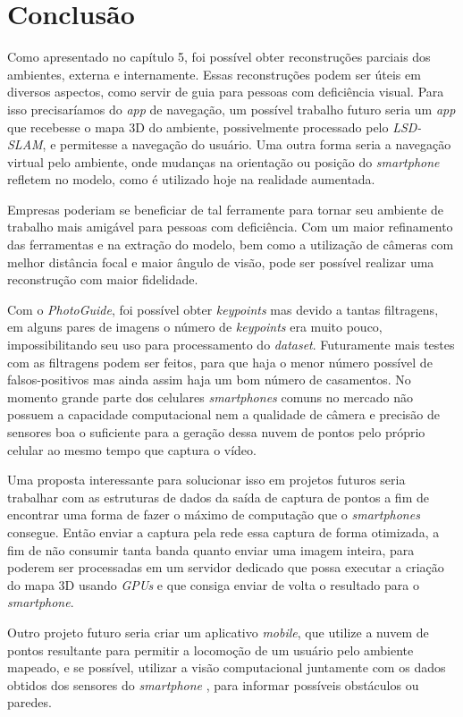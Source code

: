 \chapter{Conclusão}
Como apresentado no capítulo 5, foi possível obter reconstruções parciais dos ambientes, externa e internamente. Essas reconstruções podem ser úteis em diversos aspectos, como servir de guia para pessoas com deficiência visual. Para isso precisaríamos do \textit{app} de navegação, um possível trabalho futuro seria um \textit{app} que recebesse o mapa 3D do ambiente, possivelmente processado pelo \textit{LSD-SLAM}, e permitesse a navegação do usuário. Uma outra forma seria a navegação virtual pelo ambiente, onde mudanças na orientação ou posição do \textit{smartphone} refletem no modelo, como é utilizado hoje na realidade aumentada.

Empresas poderiam se beneficiar de tal ferramente para tornar seu ambiente de trabalho mais amigável para pessoas com deficiência. Com um maior refinamento das ferramentas e na extração do modelo, bem como a utilização de câmeras com melhor distância focal e maior ângulo de visão, pode ser possível realizar uma reconstrução com maior fidelidade. 

 Com o \textit{PhotoGuide}, foi possível obter \textit{keypoints} mas devido a tantas filtragens, em alguns pares de imagens o número de \textit{keypoints} era muito pouco, impossibilitando seu uso para processamento do \textit{dataset}. Futuramente mais testes com as filtragens podem ser feitos, para que haja o menor número possível de falsos-positivos mas ainda assim haja um bom número de casamentos. No momento grande parte dos celulares \textit{smartphones} comuns no mercado não possuem a capacidade computacional nem a qualidade de câmera e precisão de sensores boa o suficiente para a geração dessa nuvem de pontos pelo próprio celular ao mesmo tempo que captura o vídeo. 
 
 Uma proposta interessante para solucionar isso em projetos futuros seria trabalhar com as estruturas de dados da saída de captura de pontos a fim de encontrar uma forma de fazer o máximo de computação que o \textit{smartphones} consegue. Então enviar a captura pela rede essa captura de forma otimizada, a fim de não consumir tanta banda quanto enviar uma imagem inteira, para poderem ser processadas em um servidor dedicado que possa executar a criação do mapa 3D usando \textit{GPUs} e que consiga enviar de volta o resultado para o \textit{smartphone}.
	
Outro projeto futuro seria criar um aplicativo \textit{mobile}, que utilize a nuvem de pontos resultante para permitir a locomoção de um usuário pelo ambiente mapeado, e se possível, utilizar a visão computacional juntamente com os dados obtidos dos sensores do \textit{smartphone} , para informar possíveis obstáculos ou paredes.
